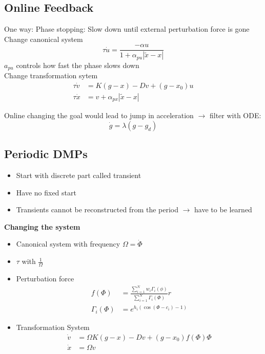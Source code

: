 \subsection{Online Feedback}%
\label{ar:sub:online_feedback}
One way: Phase stopping: Slow down until external perturbation force is gone\\
Change canonical system
\[\tau\dot{u} = \frac{-\alpha u}{1 + \alpha_{pu}|\tilde{x} - x|}\]
\(a_{pu}\) controls how fast the phase slows down\\
Change transformation sytem
\begin{align*}
  \tau \dot{v} &= K (g-x) - Dv + (g - x_0)u\\
  \tau \dot{x} &= v + \alpha_{px}|\tilde{x} -x |
\end{align*}

Online changing the goal would lead to jump in acceleration \(\rightarrow\) filter with ODE:
\[\dot{g} = \lambda(g-g_d)\]

\subsection{Periodic DMPs}%
\label{ar:sub:periodic_dmps}
\begin{itemize}
\item Start with discrete part called transient
\item Have no fixed start
\item Transients cannot be reconstructed from the period \(\rightarrow\) have to be learned
\end{itemize}

\textbf{Changing the system}
\begin{itemize}
\item Canonical system with frequency \(\Omega = \dot{\Phi}\) 
\item \(\tau\) with \(\frac{1}{\Omega}\)
\item Perturbation force
  \begin{align*}
    f(\Phi) &= \frac{\sum_{i=1}^N w_i \Gamma_i (\phi)}{\sum_{i=1}^N \Gamma_i (\Phi)}r\\
    \Gamma_i (\Phi) &= e^{h_i (\cos(\Phi - c_i) - 1)}
  \end{align*}
\item Transformation System
  \begin{align*}
    \dot{v} &= \Omega K(g - x) - Dv + (g - x_0)f(\Phi)\Phi\\
    \dot{x} &= \Omega v
  \end{align*}
\end{itemize}

